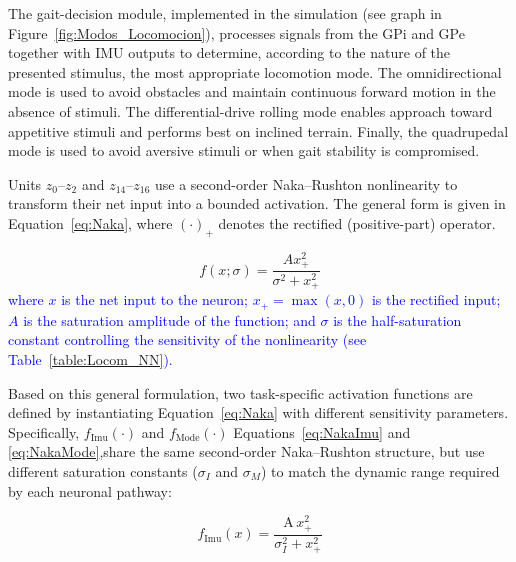 \documentclass[preprint,12pt]{elsarticle}
\newcommand{\revblue}[1]{\textcolor{blue}{#1}}
\begin{document}
The gait-decision module, implemented in the simulation (see graph in Figure~\ref{fig:Modos_Locomocion}), processes signals from the GPi and GPe together with IMU outputs to determine, according to the nature of the presented stimulus, the most appropriate locomotion mode. The omnidirectional mode is used to avoid obstacles and maintain continuous forward motion in the absence of stimuli. The differential-drive rolling mode enables approach toward appetitive stimuli and performs best on inclined terrain. Finally, the quadrupedal mode is used to avoid aversive stimuli or when gait stability is compromised. 

Units $z_0$--$z_2$ and $z_{14}$--$z_{16}$ use a second-order Naka--Rushton nonlinearity to transform their net input into a bounded activation. The general form is given in Equation~\eqref{eq:Naka}, where $(\cdot)_+$ denotes the rectified (positive-part) operator.

\begin{equation}
f(x;\sigma) = \frac{A x_+^2}{\sigma^2 + x_+^2}
\label{eq:Naka}
\end{equation}
\revblue{where $x$ is the net input to the neuron; $x_+ = \max(x,0)$ is the rectified input; $A$ is the saturation amplitude of the function; and $\sigma$ is the half-saturation constant controlling the sensitivity of the nonlinearity (see Table~\ref{table:Locom_NN}).}

Based on this general formulation, two task-specific activation functions are defined by instantiating Equation~\eqref{eq:Naka} with different sensitivity parameters. Specifically, $f_{\mathrm{Imu}}(\cdot)$ and $f_{\mathrm{Mode}}(\cdot)$ Equations~\eqref{eq:NakaImu} and \eqref{eq:NakaMode},share the same second-order Naka--Rushton structure, but use different saturation constants ($\sigma_I$ and $\sigma_M$) to match the dynamic range required by each neuronal pathway:

\begin{equation}
f_{\mathrm{Imu}}(x) = \frac{\mathrm{A}\, x_+^2}{\sigma_{I}^2 + x_+^2}
\label{eq:NakaImu}
\end{equation}
\end{document}
